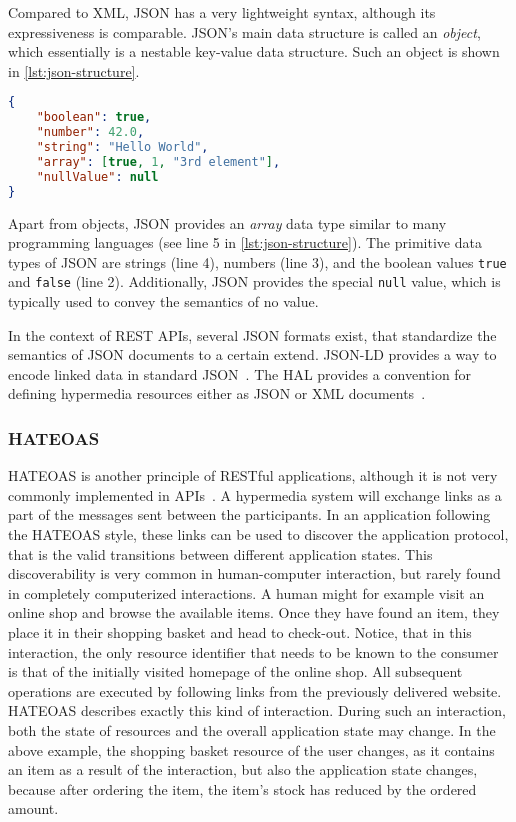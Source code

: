 Compared to \ac{XML}, \ac{JSON} has a very lightweight syntax, although its expressiveness is comparable.
\ac{JSON}'s main data structure is called an \textit{object}, which essentially is a nestable key-value data structure.
Such an object is shown in \autoref{lst:json-structure}.

\begin{lstlisting}[caption={\acs{JSON} data types and structures}, label=lst:json-structure, language=json]
{
    "boolean": true,
    "number": 42.0,
    "string": "Hello World",
    "array": [true, 1, "3rd element"],
    "nullValue": null
}
\end{lstlisting}

Apart from objects, \ac{JSON} provides an \textit{array} data type similar to many programming languages (see line 5 in \autoref{lst:json-structure}).
The primitive data types of \ac{JSON} are strings (line 4), numbers (line 3), and the boolean values \texttt{true} and \texttt{false} (line 2).
Additionally, \ac{JSON} provides the special \texttt{null} value, which is typically used to convey the semantics of no value.

In the context of \ac{REST} \acp{API}, several \ac{JSON} formats exist, that standardize the semantics of \ac{JSON} documents to a certain extend.
JSON-LD provides a way to encode linked data in standard \ac{JSON}~\cite{Kellogg2020}.
The \ac{HAL} provides a convention for defining hypermedia resources either as \ac{JSON} or \ac{XML} documents~\cite{HALdraft}.

\subsubsection{\acf{HATEOAS}}

\ac{HATEOAS} is another principle of \ac{REST}ful applications, although it is not very commonly implemented in \acp{API}~\cite{Liskin2011,Webber2010}.
A hypermedia system will exchange links as a part of the messages sent between the participants.
In an application following the \ac{HATEOAS} style, these links can be used to discover the application protocol, that is the valid transitions between different application states.
This discoverability is very common in human-computer interaction, but rarely found in completely computerized interactions.
A human might for example visit an online shop and browse the available items.
Once they have found an item, they place it in their shopping basket and head to check-out.
Notice, that in this interaction, the only resource identifier that needs to be known to the consumer is that of the initially visited homepage of the online shop.
All subsequent operations are executed by following links from the previously delivered website.
\ac{HATEOAS} describes exactly this kind of interaction.
During such an interaction, both the state of resources and the overall application state may change.
In the above example, the shopping basket resource of the user changes, as it contains an item as a result of the interaction, but also the application state changes, because after ordering the item, the item's stock has reduced by the ordered amount.


